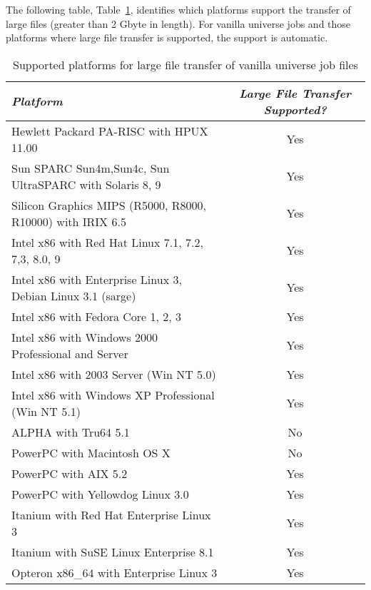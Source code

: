 The following table, 
Table~\ref{large-file-support},
identifies which platforms support
the transfer of large files (greater than 2 Gbyte in length).
For vanilla universe jobs and those platforms where large file transfer is
supported, the support is automatic.

\begin{center}
\begin{table}[hbt]
\begin{tabular}{|lc|} \hline
\emph{Platform} & \emph{Large File Transfer Supported?} \\ \hline \hline
Hewlett Packard PA-RISC with HPUX 11.00 & Yes \\ \hline
Sun SPARC Sun4m,Sun4c, Sun UltraSPARC with Solaris 8, 9 & Yes \\ \hline
Silicon Graphics MIPS (R5000, R8000, R10000) with IRIX 6.5 &  Yes \\ \hline
Intel x86 with Red Hat Linux 7.1, 7.2, 7,3, 8.0, 9 & Yes \\ 
Intel x86 with Enterprise Linux 3, Debian Linux 3.1 (sarge) & Yes \\ 
Intel x86 with Fedora Core 1, 2, 3 & Yes \\
Intel x86 with Windows 2000 Professional and Server  & Yes \\ 
Intel x86 with 2003 Server (Win NT 5.0) & Yes \\ 
Intel x86 with Windows XP Professional (Win NT 5.1) & Yes \\ \hline
ALPHA with  Tru64 5.1  & No \\ \hline
PowerPC with Macintosh OS X  & No \\
PowerPC with AIX 5.2  & Yes \\
PowerPC with Yellowdog Linux 3.0 & Yes \\ \hline
Itanium with Red Hat Enterprise Linux 3 & Yes \\
Itanium with SuSE Linux Enterprise 8.1 & Yes \\ \hline
Opteron x86\_64 with Enterprise Linux 3  & Yes \\ \hline
\end{tabular}
\caption{\label{large-file-support}Supported platforms for large file transfer of vanilla universe job files}
\end{table}
\end{center}


 



